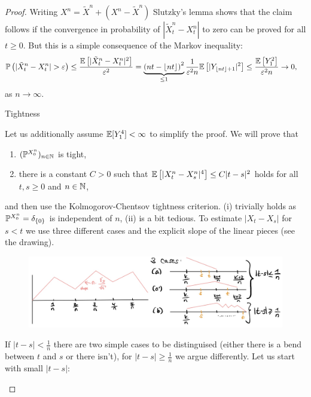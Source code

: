 \begin{proof}[Proof]
			Writing $X^n =\tilde{X}^n+ (X^n - \tilde{X}^n)$ Slutzky's lemma shows that the claim follows if the convergence in probability of $|\tilde{X}_t^n - X_t^n|$ to zero can be proved for all $t\geq 0$. But this is a simple consequence of the Markov inequality:
		\begin{align*}
				\mathbb{P}\left(\lvert\tilde{X}_t^n - X_t^n \rvert > \varepsilon \right) &\leq \frac{\E\left[ \lvert\tilde{X}_t^n - X_t^n \rvert^2\right]}{\varepsilon^2} 
				= \underbrace{\left( nt - \lfloor nt \rfloor \right)^2}_{\leq 1} \frac{1}{\varepsilon^2 n} \E \left[ \lvert Y_{\lfloor nt \rfloor + 1}\rvert^2 \right]
				\leq \frac{\E\left[ Y_1^2\right]}{\varepsilon^2  n} \to 0,
			\end{align*}
			as $n\to\infty$.
	\begin{lstep}
		Tightness
	\end{lstep}
	Let us additionally assume $\E[Y_1^4]<\infty$ to simplify the proof. We will prove that
			\begin{enumerate}[label=(\roman*)]
				\item
					$(\P^{X_0^n})_{n\in\N}$ is tight,
				\item
					there is a constant $C>0$ such that $\E \left[ \lvert X_t^n - X_s^n \rvert^{4}\right] \leq C \lvert t-s \rvert^{2}$ holds for all $t,s\geq 0$ and $n\in\N$,
			\end{enumerate}
			and then use the Kolmogorov-Chentsov tightness criterion. (i) trivially holds as $\P^{X_0^n}=\delta_{\{0\}}$ is independent of $n$, (ii) is a bit tedious. To estimate $|X_t-X_s|$ for $s<t$ we use three different cases and the explicit slope of the linear pieces (see the drawing).
			\begin{figure}[h]
				\begin{center}
					\includegraphics[scale=0.2]{Donsker.jpeg}
				\end{center}
			\end{figure}
			If $|t-s|<\frac{1}{n}$ there are two simple cases to be distinguised (either there is a bend between $t$ and $s$ or there isn't), for $|t-s|\geq \frac{1}{n}$ we argue differently. Let us start with small $|t-s|$:
			\begin{itemize}

\end{itemize}
\end{proof}
